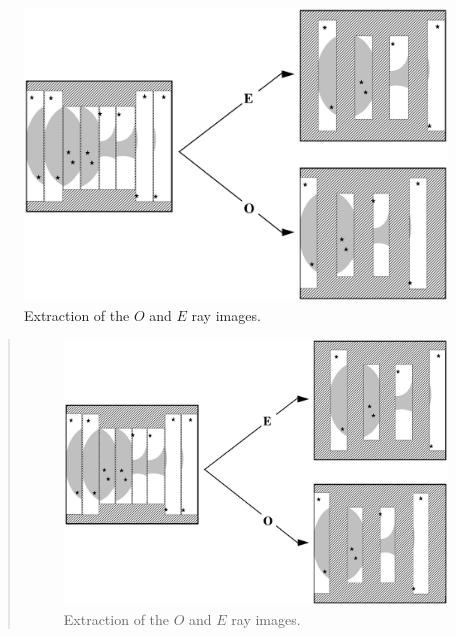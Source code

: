 \begin{latexonly}
  \begin{figure}[htbp]
  \begin{center}
  \includegraphics[scale=0.5]{sun223_figures/extract.eps}
  \caption{Extraction of the $O$ and $E$ ray images.}
  \label{fig:extract}
  \end{center}
  \end{figure}
\end{latexonly}
\begin{htmlonly}
   \begin{quote}
   \begin{figure}[hbtp]
   \label{fig:extract}
   \includegraphics[scale=0.8,width=8in]{sun223_figures/extract.eps}
   \caption{Extraction of the $O$ and $E$ ray images.}
   \end{figure}
   \end{quote}
\end{htmlonly}

